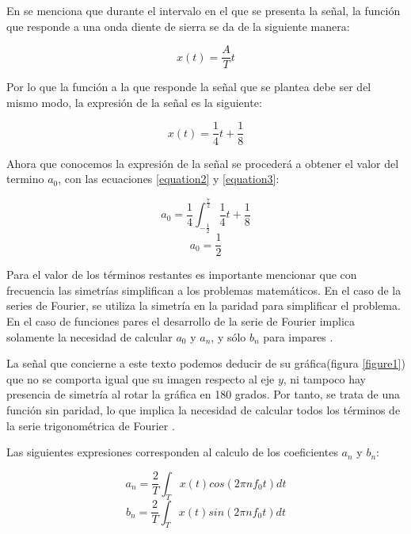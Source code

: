 \documentclass[11pt,a4paper,twocolumn]{article}
\begin{document}
    En \cite{Sawtooth} se menciona que durante el intervalo en el que se presenta la señal, la función que 
    responde a una onda diente de sierra se da de la siguiente manera:
    
    \begin{equation*}
        x(t)=\frac{A}{T} t
    \end{equation*}

    Por lo que la función a la que responde la señal que se plantea debe ser del mismo modo, la expresión 
    de la señal es la siguiente:

    \begin{equation}
        x(t)=\frac{1}{4} t+\frac{1}{8}
        \label{equation3}
    \end{equation}

    Ahora que conocemos la expresión de la señal se procederá a obtener el valor del termino $a_{0}$, con las 
    ecuaciones \ref{equation2} y \ref{equation3}:

    \begin{equation*}
        a_{0}=\frac{1}{4} \int_{-\frac{1}{2}}^{\frac{7}{2}} \frac{1}{4} t+\frac{1}{8}
    \end{equation*}
    \begin{equation}
        a_{0}=\frac{1}{2}
        \label{equation4}
    \end{equation}    

    Para el valor de los términos restantes es importante mencionar que con frecuencia las simetrías simplifican 
    a los problemas matemáticos. En el caso de la series de Fourier, se utiliza la simetría en la paridad para 
    simplificar el problema. En el caso de funciones pares el desarrollo de la serie de Fourier implica solamente 
    la necesidad de calcular $a_{0}$ y $a_{n}$, y sólo $b_{n}$ para impares \cite{parimpar}.
    
    La señal que concierne a este texto podemos deducir de su gráfica(figura \ref{figure1}) que no se comporta igual que su imagen respecto 
    al eje $y$, ni tampoco hay presencia de simetría al rotar la gráfica en 180 grados. Por tanto, se trata de una 
    función sin paridad, lo que implica la necesidad de calcular todos los términos de la serie trigonométrica de Fourier .
    
    Las siguientes expresiones corresponden al calculo de los coeficientes $a_{n}$ y $b_{n}$:

    \begin{equation}
        a_{n}=\frac{2}{T} \int_{T} x(t)cos(2\pi nf_{0}t)dt
        \label{equation5}
    \end{equation}
    \begin{equation}
        b_{n}=\frac{2}{T} \int_{T} x(t)sin(2\pi nf_{0}t)dt
        \label{equation6}
    \end{equation}
\end{document}
